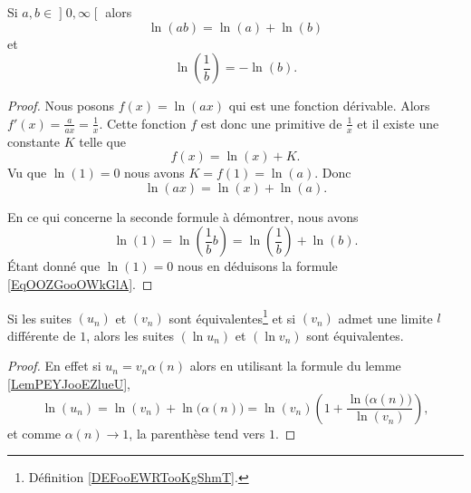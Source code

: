 \begin{lemma}   \label{LemPEYJooEZlueU}
Si \( a,b\in\mathopen] 0 , \infty \mathclose[\) alors
    \begin{equation}
        \ln(ab)=\ln(a)+\ln(b)
    \end{equation}
    et
    \begin{equation}    \label{EqOOZGooOWkGlA}
        \ln\left( \frac{1}{ b } \right)=-\ln(b).
    \end{equation}
\end{lemma}

\begin{proof}
    Nous posons \( f(x)=\ln(ax)\) qui est une fonction dérivable. Alors \( f'(x)=\frac{ a }{ ax }=\frac{1}{ x }\). Cette fonction \( f\) est donc une primitive de \( \frac{1}{ x }\) et il existe une constante \( K\) telle que
    \begin{equation}
        f(x)=\ln(x)+K.
    \end{equation}
    Vu que \( \ln(1)=0\) nous avons \( K=f(1)= \ln(a)\). Donc
    \begin{equation}
        \ln(ax)=\ln(x)+\ln(a).
    \end{equation}

    En ce qui concerne la seconde formule à démontrer, nous avons
    \begin{equation}
        \ln(1)=\ln\left( \frac{1}{ b }b \right)=\ln\left( \frac{1}{ b } \right)+\ln(b).
    \end{equation}
    Étant donné que $\ln(1)=0$ nous en déduisons la formule \eqref{EqOOZGooOWkGlA}.
\end{proof}

\begin{lemma}
    Si les suites \( (u_n)\) et \( (v_n)\) sont équivalentes\footnote{Définition \ref{DEFooEWRTooKgShmT}.} et si \( (v_n)\) admet une limite \( l\) différente de \( 1\), alors les suites \( (\ln u_n)\) et \( (\ln v_n)\) sont équivalentes.
\end{lemma}

\begin{proof}
    En effet si \( u_n=v_n\alpha(n)\) alors en utilisant la formule du lemme \ref{LemPEYJooEZlueU},
    \begin{equation}
        \ln(u_n)=\ln(v_n)+\ln\big( \alpha(n) \big)=\ln(v_n)\left( 1+\frac{ \ln\big( \alpha(n) \big) }{ \ln(v_n) } \right),
    \end{equation}
    et comme \( \alpha(n)\to 1\), la parenthèse tend vers \( 1\).
\end{proof}

